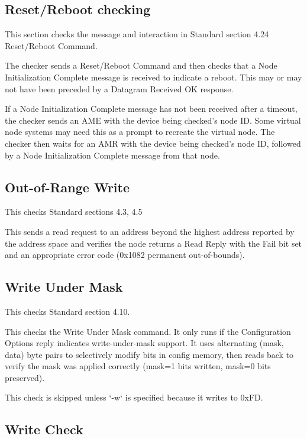 \subsection{Reset/Reboot checking}

This section checks the message and interaction in Standard section 4.24 Reset/Reboot Command.

The checker sends a Reset/Reboot Command and then checks that a Node Initialization 
Complete message is received to indicate a reboot.  This may or may not have been
preceded by a Datagram Received OK response.

If a Node Initialization Complete message has not been received after a timeout,
the checker sends an AME with the device being checked's node ID.  Some virtual node
systems may need this as a prompt to recreate the virtual node.  The checker
then waits for an AMR with the device being checked's node ID, followed by a 
Node Initialization Complete message from that node.

\subsection{Out-of-Range Write}

This checks Standard sections 4.3, 4.5

This sends a read request to an address beyond the highest address reported by
the address space and verifies the node returns a Read Reply with the Fail
bit set and an appropriate error code (0x1082 permanent out-of-bounds).

\subsection{Write Under Mask}

This checks Standard section 4.10.

This checks the Write Under Mask command.  It only runs if the Configuration Options
reply indicates write-under-mask support.  It uses alternating (mask, data) byte
pairs to selectively modify bits in config memory, then reads back to
verify the mask was applied correctly (mask=1 bits written, mask=0 bits
preserved).  

This check is skipped unless `-w` is specified because it writes to 0xFD.

\subsection{Write Check}

